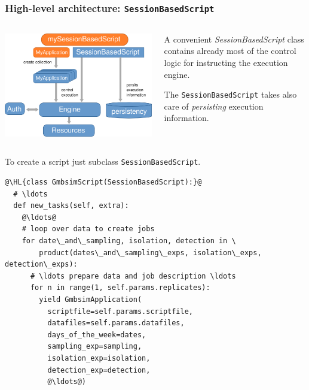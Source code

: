 \documentclass[english,serif,mathserif,xcolor=pdftex,dvipsnames,table]{beamer}
\begin{document}
\begin{frame}
  \frametitle{High-level architecture: \texttt{SessionBasedScript}}
  \begin{columns}
    \begin{column}{0.5\textwidth}
      \includegraphics[width=1\textwidth]{fig/GC3Pie_execution_model}
    \end{column}
    \begin{column}{0.6\textwidth}
      \begin{flushright}
        A convenient {\em SessionBasedScript} class contains already
        most of the control logic for instructing the execution
        engine.

        \+ The \texttt{SessionBasedScript} takes also care of {\em
          persisting} execution information.
      \end{flushright}
    \end{column}
  \end{columns}
\end{frame}


\begin{frame}[fragile]
  \begin{center}
    To create a script just subclass \texttt{SessionBasedScript}.
  \end{center}
  \begin{lstlisting}[showstringspaces=false,basicstyle=\tiny\ttfamily]
@\HL{class GmbsimScript(SessionBasedScript):}@
  # \ldots
  def new_tasks(self, extra):
    @\ldots@
    # loop over data to create jobs
    for date\_and\_sampling, isolation, detection in \
        product(dates\_and\_sampling\_exps, isolation\_exps, detection\_exps):
      # \ldots prepare data and job description \ldots
      for n in range(1, self.params.replicates):
        yield GmbsimApplication(
          scriptfile=self.params.scriptfile,
          datafiles=self.params.datafiles,
          days_of_the_week=dates,
          sampling_exp=sampling,
          isolation_exp=isolation,
          detection_exp=detection,
          @\ldots@)
  \end{lstlisting}
\end{frame}
\end{document}
